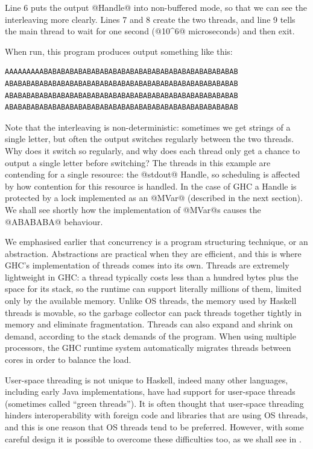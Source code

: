 \noindent Line 6 puts the output @Handle@ into non-buffered mode, so
that we can see the interleaving more clearly.  Lines 7 and 8 create
the two threads, and line 9 tells the main thread to wait for one
second (@10^6@ microseconds) and then exit.

When run, this program produces output something like this:

\begin{verbatim}
AAAAAAAAABABABABABABABABABABABABABABABABABABABABABABAB
ABABABABABABABABABABABABABABABABABABABABABABABABABABAB
ABABABABABABABABABABABABABABABABABABABABABABABABABABAB
ABABABABABABABABABABABABABABABABABABABABABABABABABABAB
\end{verbatim}

\noindent Note that the interleaving is non-deterministic: sometimes we get
strings of a single letter, but often the output switches regularly
between the two threads.  Why does it switch so regularly, and why
does each thread only get a chance to output a single letter before
switching?  The threads in this example are contending for a single
resource: the @stdout@ Handle, so scheduling is affected by how
contention for this resource is handled.  In the case of GHC a Handle
is protected by a lock implemented as an @MVar@ (described in the next
section).  We shall see shortly how the implementation of @MVar@s
causes the @ABABABA@ behaviour.


We emphasised earlier that concurrency is a program structuring
technique, or an abstraction.  Abstractions are practical when they
are efficient, and this is where GHC's implementation of threads comes
into its own.  Threads are extremely lightweight in GHC: a thread
typically costs less than a hundred bytes plus the space for its
stack, so the runtime can support literally millions of them, limited
only by the available memory.  Unlike OS threads, the memory used by
Haskell threads is movable, so the garbage collector can pack threads
together tightly in memory and eliminate fragmentation.  Threads can
also expand and shrink on demand, according to the stack demands of
the program.  When using multiple processors, the GHC runtime system
automatically migrates threads between cores in order to balance the
load.

User-space threading is not unique to Haskell, indeed many other
languages, including early Java implementations, have had support for
user-space threads (sometimes called ``green threads'').  It is often
thought that user-space threading hinders interoperability with
foreign code and libraries that are using OS threads, and this is one
reason that OS threads tend to be preferred.  However, with some
careful design it is possible to overcome these difficulties too, as
we shall see in .

